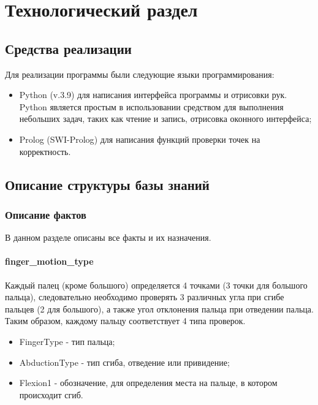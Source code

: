 \chapter{Технологический раздел}


\section{Средства реализации}
\hspace{0.6cm} Для реализации программы были следующие языки программирования:
\begin{itemize}
	\item Python (v.3.9\cite{web:python}) для написания интерфейса программы и отрисовки рук. Python является простым в использовании средством для выполнения небольших задач, таких как чтение и запись, отрисовка оконного интерфейса;
	\item Prolog (SWI-Prolog\cite{web:prolog}) для написания функций проверки точек на корректность.
\end{itemize}
 
\section{Описание структуры базы знаний}

\subsection{Описание фактов}
\hspace{0.6cm} В данном разделе описаны все факты и их назначения.
\subsubsection{finger\_motion\_type}
\hspace{0.6cm} Каждый палец (кроме большого) определяется 4 точками (3 точки для большого пальца), следовательно необходимо проверять 3 различных угла при сгибе пальцев (2 для большого), а также угол отклонения пальца при отведении пальца. Таким образом, каждому пальцу соответствует 4 типа проверок.

\begin{itemize}
	\item FingerType - тип пальца;
	\item AbductionType - тип сгиба, отведение или привидение;
	\item Flexion1 - обозначение, для определения места на пальце, в котором происходит сгиб.
\end{itemize}

